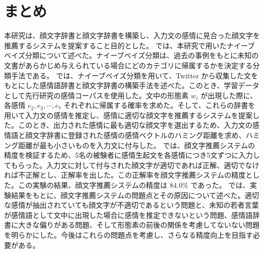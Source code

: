 \documentclass[11pt,a4j]{jsarticle}
\begin{document}
\section{まとめ}\label{sec:summary}
本研究は、顔文字辞書と顔文字辞書を構築し、入力文の感情に見合った顔文字を推薦するシステムを提案すること目的とした。
では、本研究で用いたナイーブベイズ分類について述べた。ナイーブベイズ分類は、過去の事例をもとに未知の文書があらかじめ与えられている場合にどのカテゴリに帰属するかを決定する分類手法である。
では、ナイーブベイズ分類を用いて、Twitter から収集した文をもとにした感情語辞書と顔文字辞書の構築手法を述べた。このとき、学習データとして先行研究の感情コーパスを使用した。文中の形態素 $w_i$ が出現した際に、各感情 $e_2,e_2, \cdots ,e_7$ それぞれに帰属する確率を求めた。そして、これらの辞書を用いて入力文の感情を推定し、感情に適切な顔文字を推薦するシステムを提案した。このとき、出力された感情に最も適切な顔文字を選出するため、入力文の感情語と顔文字辞書に登録された感情の感情ベクトルのハミング距離を求め、ハミング距離が最も小さいものを入力文に付与した。
では、顔文字推薦システムの精度を検証するため、5名の被験者に感情生起文を各感情につき5文ずつに入力してもらった。入力文に対して付与された顔文字が適切であれば正解、適切でなければ不正解とし、正解率を出した。この正解率を顔文字推薦システムの精度とした。この実験の結果、顔文字推薦システムの精度は 84.0\% であった。
では、実験結果をもとに、顔文字推薦システムの問題点とその原因について述べた。適切な感情が抽出されていても顔文字が不適切であるという問題と、未知の若者言葉が感情語として文中に出現した場合に感情を推定できないという問題、感情語辞書に大きな偏りがある問題、そして形態素の前後の関係を考慮してないない問題を明らかにした。今後はこれらの問題点を考慮し、さらなる精度向上を目指す必要がある。

 \clearpage
 
\end{document}
